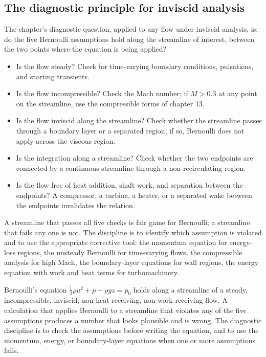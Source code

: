 \subsection{The diagnostic principle for inviscid analysis}

The chapter's diagnostic question, applied to any flow under
inviscid analysis, is: do the five Bernoulli assumptions hold along
the streamline of interest, between the two points where the
equation is being applied?

\begin{itemize}[leftmargin=*]
  \item Is the flow steady? Check for time-varying boundary
    conditions, pulsations, and starting transients.
  \item Is the flow incompressible? Check the Mach number; if
    $M > 0.3$ at any point on the streamline, use the compressible
    forms of chapter 13.
  \item Is the flow inviscid along the streamline? Check whether
    the streamline passes through a boundary layer or a separated
    region; if so, Bernoulli does not apply across the viscous
    region.
  \item Is the integration along a streamline? Check whether the
    two endpoints are connected by a continuous streamline through
    a non-recirculating region.
  \item Is the flow free of heat addition, shaft work, and
    separation between the endpoints? A compressor, a turbine, a
    heater, or a separated wake between the endpoints invalidates
    the relation.
\end{itemize}

A streamline that passes all five checks is fair game for
Bernoulli; a streamline that fails any one is not. The discipline
is to identify which assumption is violated and to use the
appropriate corrective tool: the momentum equation for energy-loss
regions, the unsteady Bernoulli for time-varying flows, the
compressible analysis for high Mach, the boundary-layer equations
for wall regions, the energy equation with work and heat terms for
turbomachinery.

\begin{principle}
Bernoulli's equation $\tfrac{1}{2}\rho u^2 + p + \rho g z = p_0$
holds along a streamline of a steady, incompressible, inviscid,
non-heat-receiving, non-work-receiving flow. A calculation that
applies Bernoulli to a streamline that violates any of the five
assumptions produces a number that looks plausible and is wrong.
The diagnostic discipline is to check the assumptions before
writing the equation, and to use the momentum, energy, or
boundary-layer equations when one or more assumptions fails.
\end{principle}


